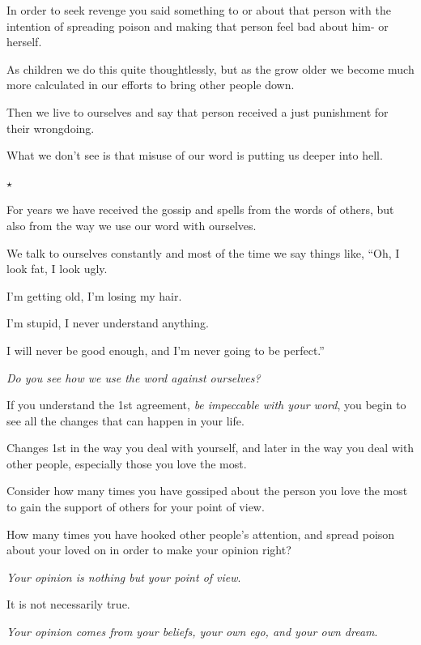 \documentclass{article}
\numberwithin{equation}{section}
\begin{document}
In order to seek revenge you said something to or about that person with the intention of spreading poison and making that person feel bad about him- or herself.

As children we do this quite thoughtlessly, but as the grow older we become much more calculated in our efforts to bring other people down.

Then we live to ourselves and say that person received a just punishment for their wrongdoing.

%

What we don't see is that misuse of our word is putting us deeper into hell.
\begin{center}
    $\star$
\end{center}
For years we have received the gossip and spells from the words of others, but also from the way we use our word with ourselves.

We talk to ourselves constantly and most of the time we say things like, ``Oh, I look fat, I look ugly.

I'm getting old, I'm losing my hair.

I'm stupid, I never understand anything.

I will never be good enough, and I'm never going to be perfect.''

\textit{Do you see how we use the word against ourselves?}


If you understand the 1st agreement, \textit{be impeccable with your word}, you begin to see all the changes that can happen in your life.

Changes 1st in the way you deal with yourself, and later in the way you deal with other people, especially those you love the most.

%
Consider how many times you have gossiped about the person you love the most to gain the support of others for your point of view.

How many times you have hooked other people's attention, and spread poison about your loved on in order to make your opinion right?

\textit{Your opinion is nothing but your point of view}.

It is not necessarily true.

\textit{Your opinion comes from your beliefs, your own ego, and your own dream}.
\end{document}
